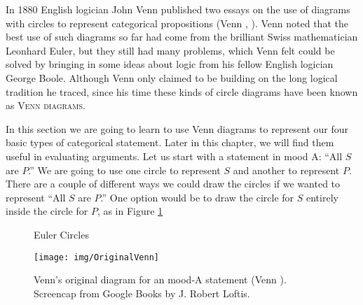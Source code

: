 In 1880 English logician John Venn published two essays on the use of diagrams with circles to represent categorical propositions (Venn \cite*{Venn1880a}, \cite*{Venn1880b}). Venn noted that the best use of such diagrams so far had come from the brilliant Swiss mathematician Leonhard Euler, but they still had many problems, which Venn felt could be solved by bringing in some ideas about logic from his fellow English logician George Boole. Although Venn only claimed to be building on the long logical tradition he traced, since his time these kinds of circle diagrams have been known as \textsc{\glspl{Venn diagram}}.

In this section we are going to learn to use Venn diagrams to represent our four basic types of categorical statement. Later in this chapter, we will find them useful in evaluating arguments. Let us start with a statement in mood A: ``All $S$ are $P$.'' We are going to use one circle to represent $S$ and another to represent $P$. There are a couple of different ways we could draw the circles if we wanted to represent ``All $S$ are $P$.'' One option would be to draw the circle for $S$ entirely inside the circle for $P$, as in Figure \ref{fig:euler_circles}

\begin{figure}
\begin{mdframed}[style=mytablehalfbox]
\begin{center}
\end{center}
\end{mdframed}
\caption{Euler Circles} \label{fig:euler_circles}
\end{figure}

\begin{figure}
\begin{mdframed}[style=mytableclearbox, userdefinedwidth=.3\textwidth]
\begin{center}
\texttt{[image: img/OriginalVenn]}
\end{center}
\end{mdframed}
\caption{Venn's original diagram for an mood-A statement (Venn \cite*{Venn1880a}). Screencap from Google Books by J.  Robert Loftis.}
\end{figure}


